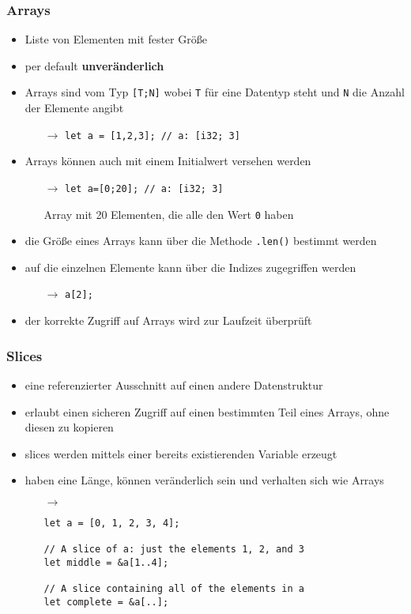 \documentclass[a4paper,12pt]{article}
\begin{document}
\subsubsection*{Arrays}
	\begin{itemize}
	  \item Liste von Elementen mit fester Größe
	  \item per default \textbf{unveränderlich}
	  \item Arrays sind vom Typ \verb|[T;N]| wobei \verb|T| für eine Datentyp steht und \verb|N| die Anzahl der Elemente angibt
	  \begin{itemize}
	      \item[$\rightarrow$] \verb|let a = [1,2,3]; // a: [i32; 3]| 
	  \end{itemize}
	  \item Arrays können auch mit einem Initialwert versehen werden
	  \begin{itemize}
	      \item[$\rightarrow$] \verb|let a=[0;20]; // a: [i32; 3] |
	      \item[] Array mit 20 Elementen, die alle den Wert \verb|0| haben 
	  \end{itemize}
	  \item die Größe eines Arrays kann über die Methode \verb|.len()| bestimmt werden
	  \item auf die einzelnen Elemente kann über die Indizes zugegriffen werden
	  \begin{itemize}
	      \item[$\rightarrow$] \verb|a[2];| 
	  \end{itemize}
	  \item der korrekte Zugriff auf Arrays wird zur Laufzeit überprüft
	\end{itemize}
\subsubsection*{Slices}
	\begin{itemize}
	  \item eine referenzierter Ausschnitt auf einen andere Datenstruktur
	  \item erlaubt einen sicheren Zugriff auf einen bestimmten Teil eines Arrays, ohne diesen zu kopieren
	  \item slices werden mittels einer bereits existierenden Variable erzeugt
	  \item haben eine Länge, können veränderlich sein und verhalten sich wie Arrays
	  \begin{itemize}
	      \item[$\rightarrow$]
	      \item []
	       \begin{verbatim}
let a = [0, 1, 2, 3, 4];

// A slice of a: just the elements 1, 2, and 3
let middle = &a[1..4]; 

// A slice containing all of the elements in a	  
let complete = &a[..]; 
	  \end{verbatim}
	  \end{itemize}
	\end{itemize}
	
\end{document}
